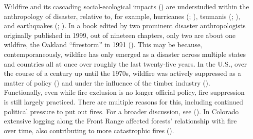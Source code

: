 \documentclass[
]{article}
\begin{document}
Wildfire and its cascading social-ecological impacts () are understudied within the anthropology of disaster, relative to, for example, hurricanes (; ), tsumanis (; ), and earthquakes (; ). In a book edited by two prominent disaster anthropologists originally published in 1999, out of nineteen chapters, only two are about one wildfire, the Oakland ``firestorm'' in 1991 (). This may be because, contemporaneously, wildfire has only emerged as a disaster across multiple states and countries all at once over roughly the last twenty-five years. In the U.S., over the course of a century up until the 1970s, wildfire was actively suppressed as a matter of policy () and under the influence of the timber industry (). Functionally, even while fire exclusion is no longer official policy, fire suppression is still largely practiced. There are multiple reasons for this, including continued political pressure to put out fires. For a broader discussion, see (). In Colorado extensive logging along the Front Range affected forests' relationship with fire over time, also contributing to more catastrophic fires ().
\end{document}
